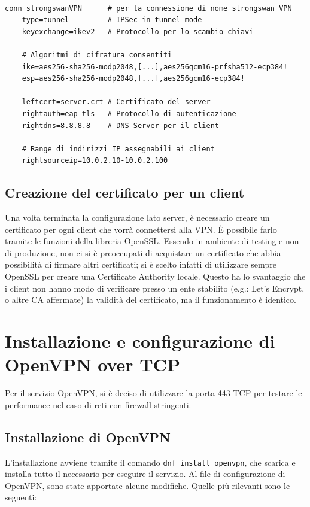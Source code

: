 \begin{verbatim}

conn strongswanVPN      # per la connessione di nome strongswan VPN
    type=tunnel         # IPSec in tunnel mode
    keyexchange=ikev2   # Protocollo per lo scambio chiavi

    # Algoritmi di cifratura consentiti
    ike=aes256-sha256-modp2048,[...],aes256gcm16-prfsha512-ecp384!
    esp=aes256-sha256-modp2048,[...],aes256gcm16-ecp384!
    
    leftcert=server.crt # Certificato del server
    rightauth=eap-tls   # Protocollo di autenticazione
    rightdns=8.8.8.8    # DNS Server per il client

    # Range di indirizzi IP assegnabili ai client
    rightsourceip=10.0.2.10-10.0.2.100
\end{verbatim}

\subsection{Creazione del certificato per un client}
Una volta terminata la configurazione lato server, è necessario creare un certificato per ogni client che vorrà connettersi alla VPN. È possibile farlo tramite le funzioni della libreria OpenSSL. Essendo in ambiente di testing e non di produzione, non ci si è preoccupati di acquistare un certificato che abbia possibilità di firmare altri certificati; si è scelto infatti di utilizzare sempre OpenSSL per creare una Certificate Authority locale. Questo ha lo svantaggio che i client non hanno modo di verificare presso un ente stabilito (e.g.: Let's Encrypt, o altre CA affermate) la validità del certificato, ma il funzionamento è identico.

\section{Installazione e configurazione di OpenVPN over TCP}
Per il servizio OpenVPN, si è deciso di utilizzare la porta 443 TCP per testare le performance nel caso di reti con firewall stringenti.
\subsection{Installazione di OpenVPN}
L'installazione avviene tramite il comando \texttt{dnf install openvpn}, che scarica e installa tutto il necessario per eseguire il servizio.
Al file di configurazione di OpenVPN, sono state apportate alcune modifiche. Quelle più rilevanti sono le seguenti:

